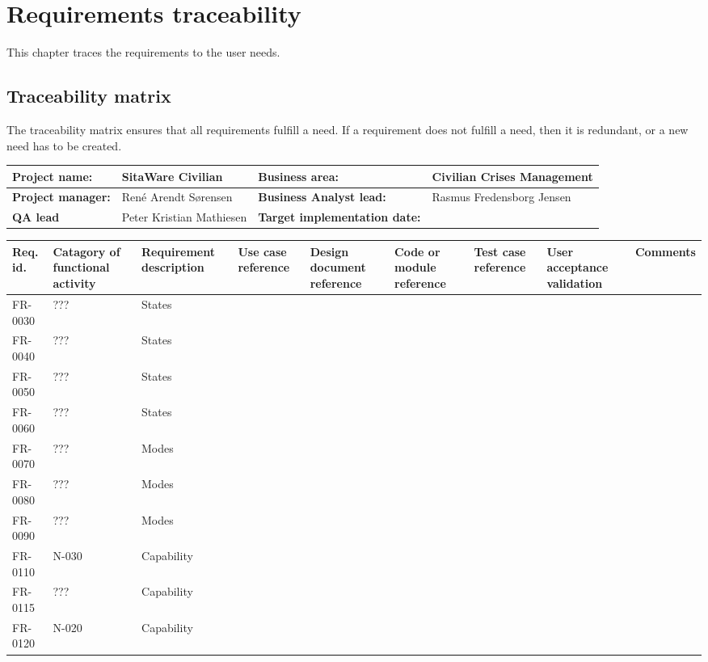 \chapter{Requirements traceability}
This chapter traces the requirements to the user needs.

\section{Traceability matrix}
The traceability matrix ensures that all requirements fulfill a need. If a requirement does not fulfill a need, then it is redundant, or a new need has to be created.


\begin{sidewaystable}
\begin{table}[H]
\begin{tabular}{|l|l|l|l|}
\hline
 \textbf{Project name:} & SitaWare Civilian & \textbf{Business area:}  & Civilian Crises Management\\ \hline
 \textbf{Project manager:} & René Arendt Sørensen & \textbf{Business Analyst lead:} & Rasmus Fredensborg  Jensen\\ \hline
 \textbf{QA lead} & Peter Kristian Mathiesen & \textbf{Target implementation date:}  & \\ \hline
\end{tabular}	
\begin{tabular}{|p{2cm}|p{2cm}|p{3cm}|p{2cm}|p{2cm}|p{2cm}|p{2cm}|p{2cm}|p{2cm}|}
\hline
 Req. id. & Catagory of functional activity & Requirement description  & Use case reference & Design document reference & Code or module reference & Test case reference & User acceptance validation & Comments\\ \hline
 FR-0030 & ??? & States & & & & & &\\ \hline 
FR-0040 & ??? & States & & & & & &\\ \hline  
FR-0050 & ??? & States & & & & & &\\ \hline  
FR-0060 & ??? & States & & & & & &\\ \hline  
FR-0070 & ??? & Modes & & & & & &\\ \hline  
FR-0080 & ??? & Modes & & & & & &\\ \hline 
FR-0090 & ??? & Modes & & & & & &\\ \hline 
 FR-0110 & N-030 & Capability & & & & & &\\ \hline
 FR-0115 & ??? & Capability & & & & & &\\ \hline
 FR-0120 & N-020 & Capability & & & & & &\\ \hline

\end{tabular}
\end{table}
\end{sidewaystable}
